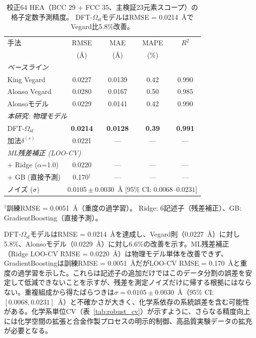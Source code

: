 \documentclass[5p,10pt]{elsarticle}
\begin{document}
\begin{table}[H]
\centering
\caption{校正64 HEA（BCC 29 + FCC 35、主検証23元素スコープ）の格子定数予測精度。
  DFT-$\Omega_\text{sf}$モデルはRMSE = 0.0214~\AA{}で
  Vegard比5.8\%改善。}
\label{tab:comparison}
\scriptsize
\begin{tabular}{@{}lcccc@{}}
\toprule
手法 & RMSE & MAE & MAPE & $R^2$ \\
   & (\AA) & (\AA) & (\%) & \\
\midrule
\multicolumn{5}{l}{\textit{ベースライン}} \\
King Vegard         & 0.0227 & 0.0139 & 0.42 & 0.990 \\
Alonso Vegard       & 0.0280 & 0.0167 & 0.50 & 0.985 \\
Alonsoモデル       & 0.0229 & 0.0141 & 0.42 & 0.990 \\
\midrule
\multicolumn{5}{l}{\textit{本研究: 物理モデル}} \\
DFT-$\Omega_\text{sf}$  & \textbf{0.0214} & \textbf{0.0128} & \textbf{0.39} & \textbf{0.991} \\
加法$\delta^{(s)}$  & 0.0221 & --- & --- & --- \\
\midrule
\multicolumn{5}{l}{\textit{ML残差補正 (LOO-CV)}} \\
+ Ridge ($\alpha$=1.0) & 0.0220 & --- & --- & --- \\
+ GB (直接予測) & 0.170$^\dagger$ & --- & --- & --- \\
\midrule
ノイズ ($\sigma$) & \multicolumn{4}{c}{$0.0105 \pm 0.0030$~\AA{} [95\% CI: $0.0068$--$0.0231$]} \\
\bottomrule
\end{tabular}
\par\smallskip
{\scriptsize $^\dagger$訓練RMSE = 0.0051~\AA{}（重度の過学習）。
Ridge: 6記述子（残差補正）、GB: GradientBoosting（直接予測）。}
\end{table}

DFT-$\Omega_\text{sf}$モデルはRMSE = 0.0214~\AA{}を達成し、Vegard則（0.0227~\AA）に対し5.8\%、Alonsoモデル（0.0229~\AA）に対し6.6\%の改善を示す。ML残差補正（Ridge LOO-CV RMSE = 0.0220~\AA）は物理モデル単体を改善できず、GradientBoostingは訓練RMSE = 0.0051~\AA だがLOO-CV RMSE = 0.170~\AA と重度の過学習を示した。これらは記述子の追加だけではこのデータ分割の誤差を安定して低減できないことを示すが、残差を測定ノイズだけに帰する根拠にはならない。重複組成から得たばらつきは$\sigma = 0.0105 \pm 0.0030$~\AA{}（95\% CI: $[0.0068, 0.0231]$~\AA{}）と不確かさが大きく、化学系依存の系統誤差を含む可能性がある。化学系単位CV（表~\ref{tab:robust_cv}）が示すように、さらなる精度向上には化学空間の拡張と合金作製プロセスの明示的制御、高品質実験データの拡充が必要となる。
\end{document}
